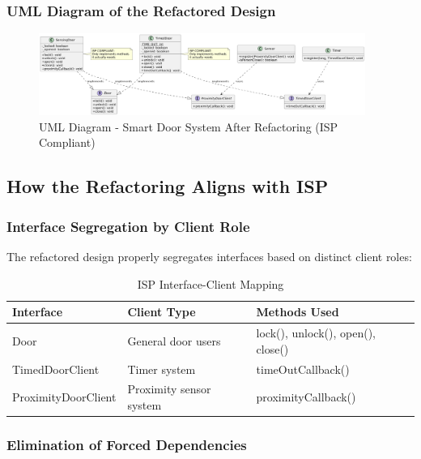 \subsubsection{UML Diagram of the Refactored Design}

\begin{figure}[H]
    \centering
    \includegraphics[width=0.95\textwidth]{ISP/plantUML/after.png}
    \caption{UML Diagram - Smart Door System After Refactoring (ISP Compliant)}
    \label{fig:isp_after}
\end{figure}

\subsection{How the Refactoring Aligns with ISP}

\subsubsection{Interface Segregation by Client Role}

The refactored design properly segregates interfaces based on distinct client roles:

\begin{table}[H]
\centering
\begin{tabular}{|l|p{4cm}|p{5cm}|}
\hline
\textbf{Interface} & \textbf{Client Type} & \textbf{Methods Used} \\
\hline
Door & General door users & lock(), unlock(), open(), close() \\
\hline
TimedDoorClient & Timer system & timeOutCallback() \\
\hline
ProximityDoorClient & Proximity sensor system & proximityCallback() \\
\hline
\end{tabular}
\caption{ISP Interface-Client Mapping}
\label{tab:isp_interface_clients}
\end{table}

\subsubsection{Elimination of Forced Dependencies}

